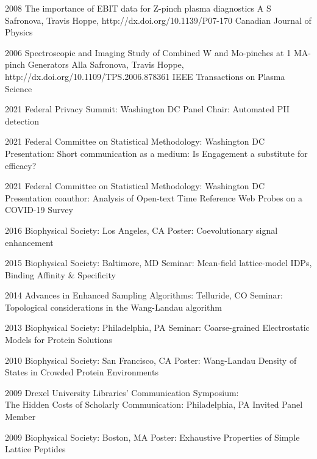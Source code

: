\documentclass[]{scrartcl}
\begin{document}
\begin{cleanCV}
\Paper
{2008}
{The importance of EBIT data for Z-pinch plasma diagnostics}
{A S Safronova, Travis Hoppe, \etal}
{http://dx.doi.org/10.1139/P07-170}
{Canadian Journal of Physics}

\Paper
{2006}
{Spectroscopic and Imaging Study of Combined W and Mo-pinches 
  at 1 MA-pinch Generators}
{Alla Safronova, Travis Hoppe, \etal}
{http://dx.doi.org/10.1109/TPS.2006.878361}
{IEEE Transactions on Plasma Science}





\WorkExperienceX
{2021}
{Federal Privacy Summit: Washington DC}
{Panel Chair: Automated PII detection}

\WorkExperienceX
{2021}
{Federal Committee on Statistical Methodology: Washington DC}
{Presentation: Short communication as a medium: Is Engagement a substitute for efficacy?}

\WorkExperienceX
{2021}
{Federal Committee on Statistical Methodology: Washington DC}
{Presentation coauthor: Analysis of Open-text Time Reference Web Probes on a COVID-19 Survey}

\WorkExperienceX
{2016}
{Biophysical Society: Los Angeles, CA}
{Poster: Coevolutionary signal enhancement}


\WorkExperienceX
{2015}
{Biophysical Society: Baltimore, MD}
{Seminar: Mean-field lattice-model IDPs, Binding Affinity \& Specificity}

\WorkExperienceX
{2014}
{Advances in Enhanced Sampling Algorithms: Telluride, CO}
{Seminar: Topological considerations in the Wang-Landau algorithm}

\WorkExperienceX
{2013}
{Biophysical Society: Philadelphia, PA}
{Seminar: Coarse-grained Electrostatic Models for Protein Solutions}

\WorkExperienceX
{2010}
{Biophysical Society: San Francisco, CA}
{Poster: Wang-Landau Density of States in Crowded Protein Environments}

\WorkExperienceX
{2009}
{Drexel University Libraries' Communication Symposium:\\The Hidden Costs of Scholarly Communication: Philadelphia, PA}
{Invited Panel Member}

\WorkExperienceX
{2009}
{Biophysical Society: Boston, MA}
{Poster: Exhaustive Properties of Simple Lattice Peptides}




\end{cleanCV}
\end{document}
